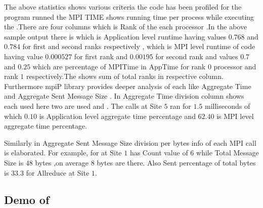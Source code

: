 The above statistics shows various criteria the code has been profiled for the program 
runned the MPI TIME shows running time per process while executing the .There are four
columns  which is Rank of the each processor .In the above sample output there is which
is Application level runtime having values $0.768$ and $0.784$ for first and second ranks respectively
, which is MPI level runtime of code having value $0.000527$ for first rank
and $0.00195$ for second rank and values $0.7$  and  $0.25$  which are percentage of MPITime in AppTime
for rank $0$ processor and rank $1$ respectively.The \code{*} shows sum of total ranks in respective column.
Furthermore mpiP library provides deeper analysis of each  like Aggregate Time and 
Aggregate Sent Message Size . In Aggregate Time division  column shows each  used
here two are used  and . The  calls at Site $5$ ran for $1.5$ milliseconds 
of which $0.10$ is Application level aggregate time percentage and $62.40$ is MPI level aggregate time percentage.

Similarly in Aggregate Sent Message Size division per bytes info of each MPI call is elaborated.
For example, for  at Site $1$ has Count value of $6$ while Total Message Size is $48$ bytes ,on average $8$ bytes are there.
Also Sent percentage of total bytes is $33.3$ for Allreduce at Site $1$.



\subsection{Demo of }

